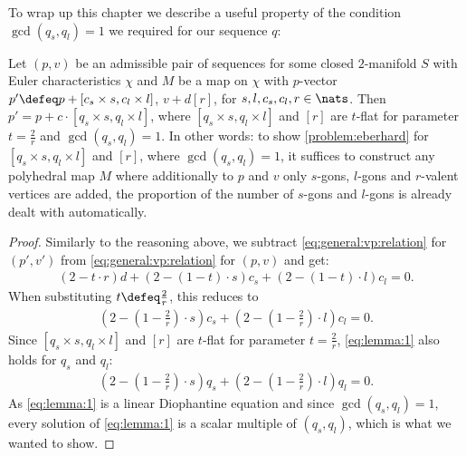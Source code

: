 To wrap up this chapter we describe a useful property of the condition $\gcd(q_s, q_l) = 1$ we required for our sequence $q$:

\begin{lemma}\label{lem:2:valued:eberhard}
  Let $(p, v)$ be an admissible pair of sequences for some closed $2$-manifold $S$ with {\sc Euler} characteristics $\chi$ and $M$ be a map on $\chi$ with $p$-vector $p' \defeq p + [c_s \times s, c_l \times l]$, $v + d [r]$, for $s, l, c_s, c_l, r \in \nats$. Then $p' = p + c \cdot [q_s \times s, q_l \times l]$, where $[q_s \times s, q_l \times l]$ and $[r]$ are $t$-flat for parameter $t = \tfrac{2}{r}$ and $\gcd(q_s, q_l) = 1$. In other words: to show \autoref{problem:eberhard} for $[q_s \times s, q_l \times l]$ and $[r]$, where $\gcd(q_s, q_l) = 1$, it suffices to construct any polyhedral map $M$ where additionally to $p$ and $v$ only $s$-gons, $l$-gons and $r$-valent vertices are added, the proportion of the number of $s$-gons and $l$-gons is already dealt with automatically.
  \begin{proof}
    Similarly to the reasoning above, we subtract \eqref{eq:general:vp:relation} for $(p', v')$ from \eqref{eq:general:vp:relation} for $(p, v)$ and get:
    \begin{align*}
      (2 - t \cdot r) d + (2 - (1 - t) \cdot s) c_s +  (2 - (1 - t) \cdot l) c_l = 0. 
    \end{align*}
    When substituting $t \defeq \tfrac{2}{r}$, this reduces to
    \begin{align}
      (2 - (1 - \tfrac{2}{r}) \cdot s) c_s + (2 - (1 - \tfrac{2}{r}) \cdot l) c_l = 0. \label{eq:lemma:1}
    \end{align}
    Since $[q_s \times s, q_l \times l]$ and $[r]$ are $t$-flat for parameter $t = \tfrac{2}{r}$, \eqref{eq:lemma:1} also holds for $q_s$ and $q_l$:
    \begin{align}
      (2 - (1 - \tfrac{2}{r}) \cdot s) q_s + (2 - (1 - \tfrac{2}{r}) \cdot l) q_l = 0.
    \end{align}
    As \eqref{eq:lemma:1} is a linear {\sc Diophantine} equation and since $\gcd(q_s, q_l) = 1$, every solution of \eqref{eq:lemma:1} is a scalar multiple of $(q_s, q_l)$, which is what we wanted to show.
  \end{proof}
\end{lemma}
